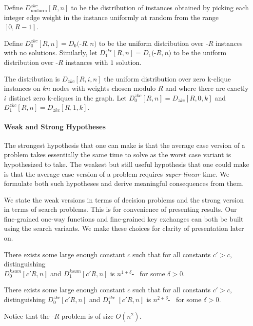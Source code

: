 \begin{definition}
Define $D^{zkc}_{\textrm{uniform}}[R,n]$ to be the distribution of instances obtained by picking each integer edge weight in the instance uniformly at random from the range $[0,R-1]$.

Define $D^{zkc}_{0}[R,n] = D_0($\zkclique-$R, n)$ to be the uniform distribution over \zkclique-$R$ instances with no solutions. Similarly, let $D^{zkc}_{1}[R,n] = D_1($\zkclique-$R, n)$ to be the uniform distribution over \zkclique-$R$  instances with $1$ solution.

The distribution is $D_{zkc}[R,i,n]$ the uniform distribution over zero k-clique instances on $kn$ nodes with weights chosen modulo $R$ and where there are exactly $i$ distinct zero k-cliques in the graph.
Let $D^{zkc}_{0}[R,n] = D_{zkc}[R,0,k]$  and $D^{zkc}_{1}[R,n] = D_{zkc}[R,1,k]$.
\end{definition}

\paragraph{Weak and Strong Hypotheses}
The strongest hypothesis that one can make is that the average case version of a problem takes essentially the same time to solve as the worst case variant is hypothesized to take. The weakest but still useful hypothesis that one could make is that the average case version of a problem requires {\em super-linear} time. We formulate both such hypotheses and derive meaningful consequences from them.


We state the weak versions in terms of decision problems and the strong version in terms of search problems. This is for convenience of presenting results. Our fine-grained one-way functions and fine-grained key exchanges can both be built using the search variants. We make these choices for clarity of presentation later on. 

\begin{definition}[\Weakksum]\label{def:weak-k-sum}
	There exists some large enough constant $c$ such that for all constants $c'>c$, distinguishing\\$D^{ksum}_{0}[c'R,n]$ and $D^{ksum}_{1}[c'R,n]$ is
$n^{1+\delta}$-\ACIH~ for some $\delta>0$.
\end{definition}

\begin{definition}[\Weakzkc]
	There exists some large enough constant $c$ such that for all constants $c'>c$, distinguishing $D^{zkc}_{0}[c'R,n]$ and $D^{zkc}_{1}$ $[c'R,n]$ is
	$n^{2+\delta}$-\ACIH~ for some $\delta>0$.
	
	Notice that the \zkclique-$R$ problem is of size $O(n^2)$.
\end{definition}

